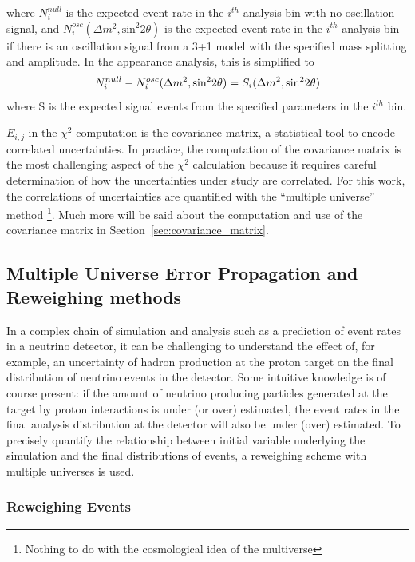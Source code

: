 where $N^{null}_i$ is the expected event rate in the $i^{th}$ analysis bin with no oscillation signal, and $N^{osc}_i(\Delta m^2, \text{sin}^2 2 \theta )$ is the expected event rate in the $i^{th}$ analysis bin if there is an oscillation signal from a 3+1 model with the specified mass splitting and amplitude.  In the \nue appearance analysis, this is simplified to 
\begin{equation}
\begin{centering}
N^{null}_i - N^{osc}_i(\Delta m^2, \text{sin}^2 2 \theta ) = S_i(\Delta m^2, \text{sin}^2 2 \theta )
\end{centering}
\end{equation}
where S is the expected signal events from the specified parameters in the $i^{th}$ bin.

$E_{i,j}$ in the $\chi^2$ computation is the covariance matrix, a statistical tool to encode correlated uncertainties.  In practice, the computation of the covariance matrix is the most challenging aspect of the $\chi^2$ calculation because it requires careful determination of how the uncertainties under study are correlated.  For this work, the correlations of uncertainties are quantified with the ``multiple universe'' method \footnote{Nothing to do with the cosmological idea of the multiverse}.  Much more will be said about the computation and use of the covariance matrix in Section~\ref{sec:covariance_matrix}.

\subsection{Multiple Universe Error Propagation and Reweighing methods}

In a complex chain of simulation and analysis such as a prediction of event rates in a neutrino detector, it can be challenging to understand the effect of, for example, an uncertainty of hadron production at the proton target on the final distribution of neutrino events in the detector.  Some intuitive knowledge is of course present: if the amount of neutrino producing particles generated at the target by proton interactions is under (or over) estimated, the event rates in the final analysis distribution at the detector will also be under (over) estimated.  To precisely quantify the relationship between initial variable underlying the simulation and the final distributions of events, a reweighing scheme with multiple universes is used.

\subsubsection{Reweighing Events}

